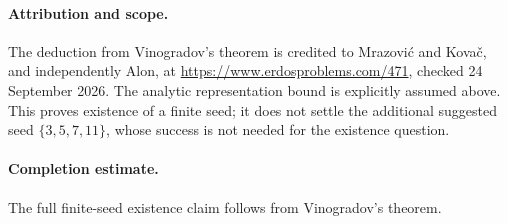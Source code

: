 \paragraph{Attribution and scope.}
The deduction from Vinogradov's theorem is credited to
Mrazovi\'c and Kova\v{c}, and independently Alon, at
\url{https://www.erdosproblems.com/471}, checked 24 September 2026.
The analytic representation bound is explicitly assumed above.
This proves existence of a finite seed; it does not settle the
additional suggested seed \(\{3,5,7,11\}\), whose success is not
needed for the existence question.

\paragraph{Completion estimate.}
The full finite-seed existence claim follows from Vinogradov's theorem.
